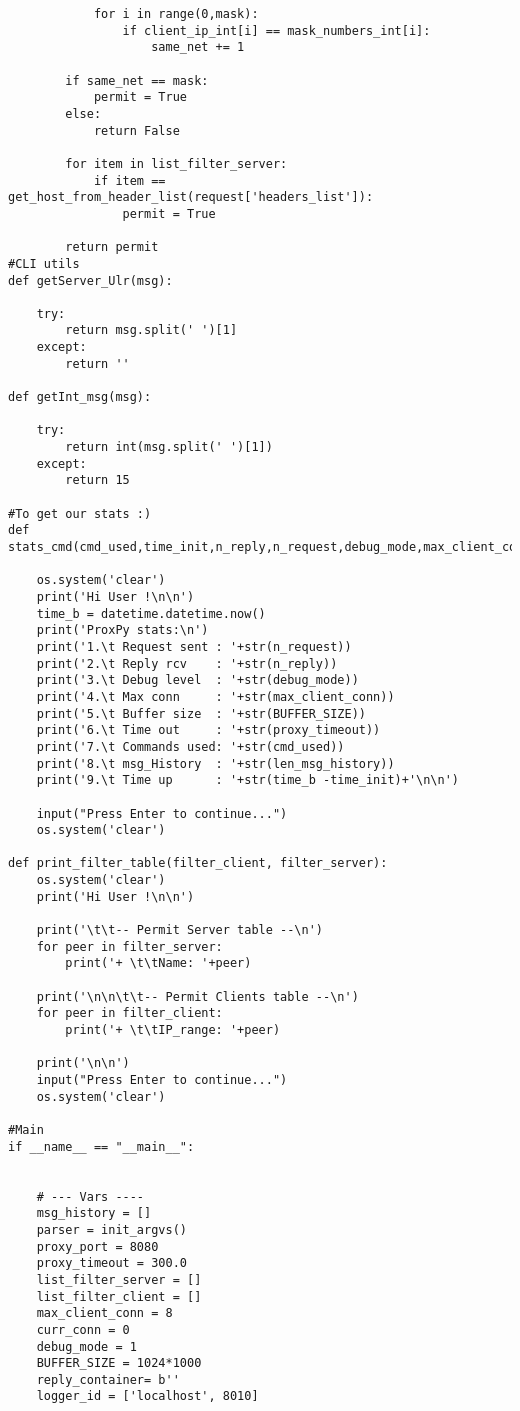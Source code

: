 \begin{verbatim}
            for i in range(0,mask):
                if client_ip_int[i] == mask_numbers_int[i]:
                    same_net += 1

        if same_net == mask:
            permit = True
        else:
            return False
        
        for item in list_filter_server:
            if item == get_host_from_header_list(request['headers_list']):
                permit = True

        return permit
#CLI utils
def getServer_Ulr(msg):

    try:
        return msg.split(' ')[1]
    except:
        return ''

def getInt_msg(msg):

    try:
        return int(msg.split(' ')[1])
    except:
        return 15

#To get our stats :)
def stats_cmd(cmd_used,time_init,n_reply,n_request,debug_mode,max_client_conn,BUFFER_SIZE,proxy_timeout,len_msg_history):

    os.system('clear')
    print('Hi User !\n\n')
    time_b = datetime.datetime.now()
    print('ProxPy stats:\n')
    print('1.\t Request sent : '+str(n_request))
    print('2.\t Reply rcv    : '+str(n_reply))
    print('3.\t Debug level  : '+str(debug_mode))
    print('4.\t Max conn     : '+str(max_client_conn))
    print('5.\t Buffer size  : '+str(BUFFER_SIZE))
    print('6.\t Time out     : '+str(proxy_timeout))
    print('7.\t Commands used: '+str(cmd_used))
    print('8.\t msg_History  : '+str(len_msg_history))
    print('9.\t Time up      : '+str(time_b -time_init)+'\n\n')  
    
    input("Press Enter to continue...")
    os.system('clear')

def print_filter_table(filter_client, filter_server):
    os.system('clear')
    print('Hi User !\n\n')
    
    print('\t\t-- Permit Server table --\n')
    for peer in filter_server:
        print('+ \t\tName: '+peer)  
    
    print('\n\n\t\t-- Permit Clients table --\n')
    for peer in filter_client:
        print('+ \t\tIP_range: '+peer)
    
    print('\n\n')
    input("Press Enter to continue...")
    os.system('clear')

#Main
if __name__ == "__main__":
    

    # --- Vars ----
    msg_history = []
    parser = init_argvs()
    proxy_port = 8080
    proxy_timeout = 300.0
    list_filter_server = []
    list_filter_client = []
    max_client_conn = 8
    curr_conn = 0
    debug_mode = 1
    BUFFER_SIZE = 1024*1000
    reply_container= b''
    logger_id = ['localhost', 8010]



\end{verbatim}
